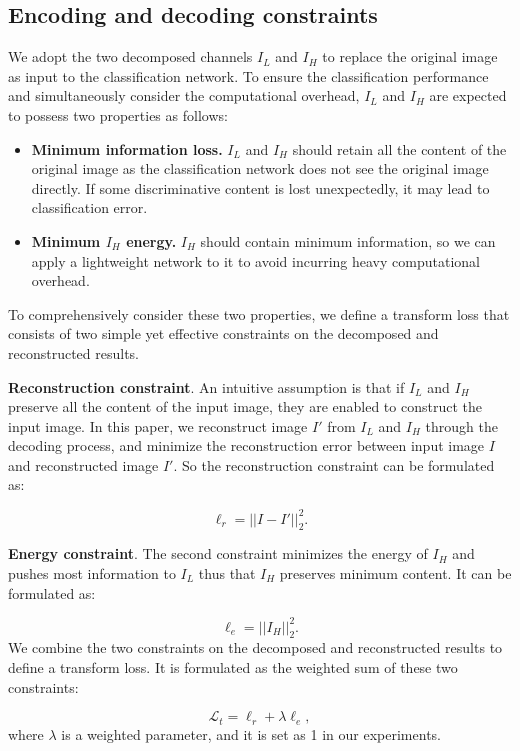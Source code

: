\documentclass[letterpaper]{article} %
\begin{document}
\subsection{Encoding and decoding constraints}
We adopt the two decomposed channels $I_L$ and $I_H$ to replace the original image as input to the classification network.  To ensure the classification performance and simultaneously consider the computational overhead, $I_L$ and $I_H$ are expected to possess two properties as follows:
\begin{itemize}
\item \textbf{Minimum information loss. } $I_L$ and $I_H$ should retain all the content of the original image as the classification network does not see the original image directly. If some discriminative content is lost unexpectedly, it may lead to classification error.
\item \textbf{Minimum $I_H$ energy. } $I_H$ should contain minimum information, so we can apply a lightweight network to it to avoid incurring heavy computational overhead.
\end{itemize}
To comprehensively consider these two properties, we define a transform loss that consists of two simple yet effective constraints on the decomposed and reconstructed results.

\noindent\textbf{Reconstruction constraint}.
An intuitive assumption is that if $I_L$ and $I_H$ preserve all the content of the input image, they are enabled to construct the input image. In this paper, we reconstruct image $I'$ from $I_L$ and $I_H$ through the decoding process, and minimize the reconstruction error between input image $I$ and reconstructed image $I'$. So the reconstruction constraint can be formulated as:

\begin{equation}
\ell_r=\vert\vert I-I' \vert\vert_2^2.
\end{equation}

\noindent\textbf{Energy constraint}.
The second constraint minimizes the energy of $I_H$ and pushes most information to $I_L$ thus that $I_H$ preserves minimum content. It can be formulated as:

\begin{equation}
\ell_e=\vert\vert I_H \vert\vert_2^2.
\end{equation}
We combine the two constraints on the decomposed and reconstructed results to define a transform loss. It is formulated as the weighted sum of these two constraints:

\begin{equation}
\mathcal{L}_t=\ell_r+\lambda\ell_e,
\end{equation}
where $\lambda$ is a weighted parameter, and it is set as 1 in our experiments.
\end{document}

